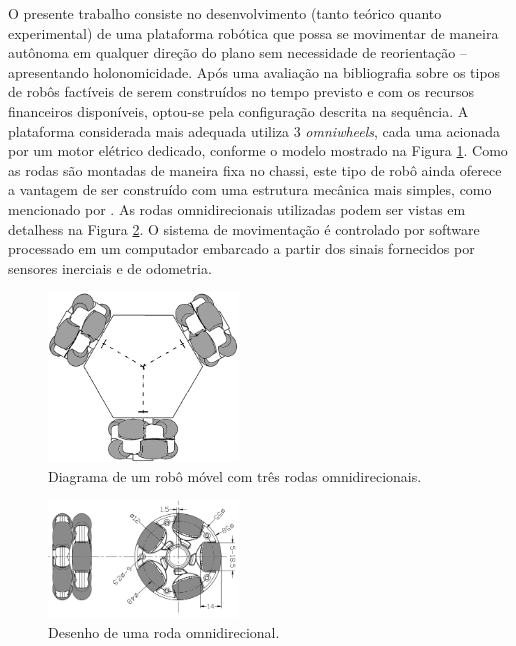
O presente trabalho consiste no desenvolvimento (tanto teórico quanto experimental) de uma plataforma robótica que possa se movimentar de maneira autônoma em qualquer direção do plano sem necessidade de reorientação -- apresentando holonomicidade. Após uma avaliação na bibliografia sobre os tipos de robôs factíveis de serem construídos no tempo previsto e com os recursos financeiros disponíveis, optou-se pela configuração descrita na sequência. A plataforma considerada mais adequada utiliza 3 \emph{omniwheels}, cada uma acionada por um motor elétrico dedicado, conforme o modelo mostrado na Figura \ref{fig:tomr_ritter}. Como as rodas são montadas de maneira fixa no chassi, este tipo de robô ainda oferece a vantagem de ser construído com uma estrutura mecânica mais simples, como mencionado por \citet{siciliano2016springer}. As rodas omnidirecionais utilizadas podem ser vistas em detalhess na Figura \ref{fig:omniwheel}. O sistema de movimentação é controlado por software processado em um computador embarcado a partir dos sinais fornecidos por sensores inerciais e de odometria.

\begin{figure}[h]
  \centering
  \includegraphics[width = 0.45\textwidth]{imagens/tomr_ritter_mod}
  \caption{Diagrama de um robô móvel com três rodas omnidirecionais.}
  \label{fig:tomr_ritter}
\end{figure}

\begin{figure}[h]
  \centering
  \includegraphics[width = 0.45\textwidth]{imagens/omniwheel}
  \caption{Desenho de uma roda omnidirecional.}
  \label{fig:omniwheel}
\end{figure}

